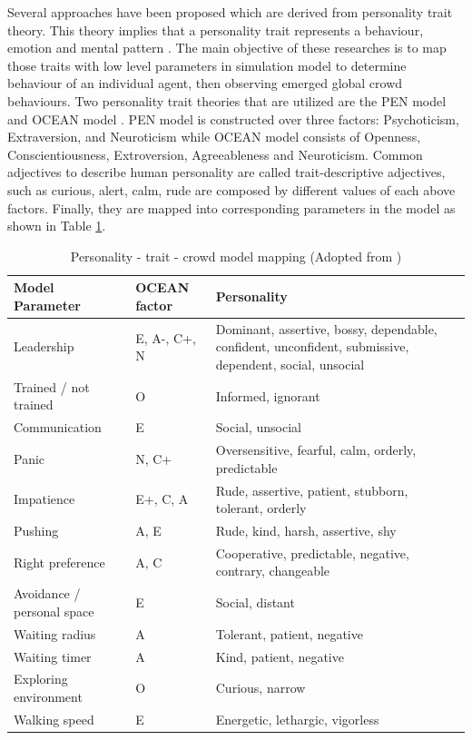 Several approaches have been proposed which are derived from personality trait theory. This theory implies that a personality trait represents a behaviour, emotion and mental pattern \citep{Durupinar2008}. The main objective of these researches is to map those traits with low level parameters in simulation model to determine behaviour of an individual agent, then observing emerged global crowd behaviours. Two personality trait theories that are utilized are the PEN model \citep{Guy2011} and OCEAN model \citep{Durupinar2008,Durupinar2011}. PEN model is constructed over three factors: Psychoticism, Extraversion, and Neuroticism while OCEAN model consists of Openness, Conscientiousness, Extroversion, Agreeableness and Neuroticism. Common adjectives to describe human personality are called trait-descriptive adjectives, such as curious, alert, calm, rude are composed by different values of each above factors. Finally, they are mapped into corresponding parameters in the model as shown in Table \ref{table:oceanPersonality}.

\begin{table}
	\caption{Personality - trait - crowd model mapping (Adopted from \citet{Durupinar2008})}
	\label{table:oceanPersonality}
	\centering
	\begin{tabular}{|l|l|p{6.5cm}|}
		\hline
		\textbf{Model Parameter} & \textbf{OCEAN factor} & \textbf{Personality} \\ \hline \hline
		Leadership & E, A-, C+, N & Dominant, assertive, bossy, dependable, confident, unconfident, submissive, dependent, social, unsocial \\ \hline
		Trained / not trained & O & Informed, ignorant \\ \hline
		Communication & E & Social, unsocial \\ \hline
		Panic & N, C+ & Oversensitive, fearful, calm, orderly, predictable \\ \hline
		Impatience & E+, C, A & Rude, assertive, patient, stubborn, tolerant, orderly \\ \hline
		Pushing & A, E & Rude, kind, harsh, assertive, shy \\ \hline
		Right preference & A, C & Cooperative, predictable, negative, contrary, changeable \\ \hline
		Avoidance / personal space & E & Social, distant \\ \hline
		Waiting radius & A & Tolerant, patient, negative \\ \hline
		Waiting timer & A & Kind, patient, negative \\ \hline
		Exploring environment & O & Curious, narrow \\ \hline
		Walking speed & E & Energetic, lethargic, vigorless \\ \hline
	\end{tabular}
\end{table}

